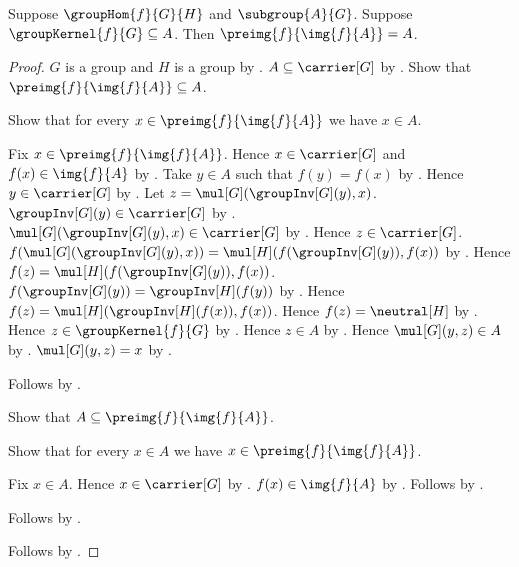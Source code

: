 \begin{theorem}\label{group_hom_preimage_image_eq}
    Suppose $\groupHom{f}{G}{H}$ and $\subgroup{A}{G}$.
    Suppose $\groupKernel{f}{G}\subseteq A$.
    Then $\preimg{f}{\img{f}{A}}=A$.
\end{theorem}
\begin{proof}
    $G$ is a group and $H$ is a group by
        .
    $A\subseteq\carrier[G]$ by .
    Show that $\preimg{f}{\img{f}{A}}\subseteq A$.
    \begin{subproof}
        Show that for every $x\in\preimg{f}{\img{f}{A}}$ we have
            $x\in A$.
        \begin{subproof}
            Fix $x\in\preimg{f}{\img{f}{A}}$.
            Hence $x\in\carrier[G]$ and $f(x)\in\img{f}{A}$ by
                .
            Take $y\in A$ such that $f(y)=f(x)$ by
                .
            Hence $y\in\carrier[G]$ by .
            Let $z=\mul[G](\groupInv[G](y),x)$.
            $\groupInv[G](y)\in\carrier[G]$ by
                .
            $\mul[G](\groupInv[G](y),x)\in\carrier[G]$ by
                .
            Hence $z\in\carrier[G]$.
            $f(\mul[G](\groupInv[G](y),x))
                =\mul[H](f(\groupInv[G](y)),f(x))$ by
                .
            Hence $f(z)=\mul[H](f(\groupInv[G](y)),f(x))$.
            $f(\groupInv[G](y))=\groupInv[H](f(y))$ by
                .
            Hence $f(z)=\mul[H](\groupInv[H](f(x)),f(x))$.
            Hence $f(z)=\neutral[H]$ by
                .
            Hence $z\in\groupKernel{f}{G}$ by
                .
            Hence $z\in A$ by .
            Hence $\mul[G](y,z)\in A$ by .
            $\mul[G](y,z)=x$ by
                .
        \end{subproof}
        Follows by .
    \end{subproof}
    Show that $A\subseteq\preimg{f}{\img{f}{A}}$.
    \begin{subproof}
        Show that for every $x\in A$ we have
            $x\in\preimg{f}{\img{f}{A}}$.
        \begin{subproof}
            Fix $x\in A$.
            Hence $x\in\carrier[G]$ by .
            $f(x)\in\img{f}{A}$ by .
            Follows by .
        \end{subproof}
        Follows by .
    \end{subproof}
    Follows by .
\end{proof}

